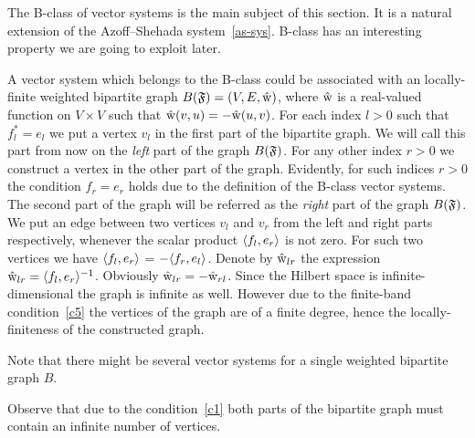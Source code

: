 \documentclass[12pt]{article}
\begin{document}
    The B-class of vector systems is the main subject of this section.
    It is a natural extension of the Azoff--Shehada system~\eqref{as-sys}.
    B-class has an interesting property we are going to exploit later.
    \begin{remark}
      A vector system which belongs to the B-class could be associated with an
        locally-finite weighted bipartite graph $B(\mathfrak{F}) = (V, E, \mathrm{\hat{w}})$, where $\mathrm{\hat{w}}$ is a
        real-valued function on $V\times V$ such that $\mathrm{\hat{w}}(v, u) = -\mathrm{\hat{w}}(u, v)$.
      For each index $l > 0$ such that $f^*_l = e_l$ we put a vertex $v_l$ in the first part of the bipartite graph.
      We will call this part from now on the \emph{left} part of the graph $B(\mathfrak{F})$.
      For any other index $r > 0$ we construct a vertex in the other part of the graph.
      Evidently, for such indices $r > 0$ the condition $f_r = e_r$ holds due to the definition of the B-class vector systems.
      The second part of the graph will be referred as the \emph{right} part of the graph $B(\mathfrak{F})$.
      We put an edge between two vertices $v_l$ and $v_r$ from the left and right parts respectively,
        whenever the scalar product $\langle f_l, e_r \rangle$ is not zero.
      For such two vertices we have $\langle f_l, e_r \rangle$ = $-\langle f_r, e_l \rangle$.
      Denote by $\mathrm{\hat{w}}_{lr}$ the expression $\mathrm{\hat{w}}_{lr} = \langle f_l, e_r \rangle^{-1}$.
      Obviously $\mathrm{\hat{w}}_{lr} = -\mathrm{\hat{w}}_{rl}$.
      Since the Hilbert space is infinite-dimensional the graph is infinite as well.
      However due to the finite-band condition~\ref{c5} the vertices of the graph are of a finite degree, hence the locally-finiteness of
        the constructed graph.
    \end{remark}
    \begin{remark}
      Note that there might be several vector systems for a single weighted bipartite graph $B$.
    \end{remark}
    \begin{remark}
      Observe that due to the condition~\ref{c1} both parts of the bipartite graph must
        contain an infinite number of vertices.
    \end{remark}
\end{document}
